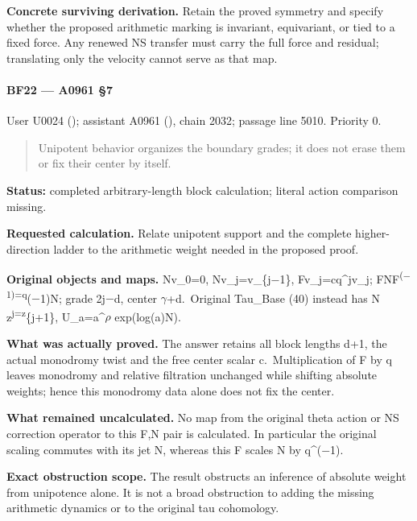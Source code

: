 \textbf{Concrete surviving derivation.} Retain the proved symmetry and
specify whether the proposed arithmetic marking is invariant,
equivariant, or tied to a fixed force. Any renewed NS transfer must
carry the full force and residual; translating only the velocity cannot
serve as that map.

\paragraph{BF22 --- A0961 §7}\label{bf22-a0961-7}

User U0024 (\protect{});
assistant A0961 (\protect{}),
chain 2032; passage line 5010. Priority 0.

\begin{quote}
Unipotent behavior organizes the boundary grades; it does not erase them
or fix their center by itself.
\end{quote}

\textbf{Status:} completed arbitrary-length block calculation; literal
action comparison missing.

\textbf{Requested calculation.} Relate unipotent support and the
complete higher-direction ladder to the arithmetic weight needed in the
proposed proof.

\textbf{Original objects and maps.} Nv\_0=0,
Nv\_j=v\_\{j\allowbreak{}\ensuremath{−}\allowbreak{}1\},
Fv\_j=cq\^{}jv\_j;
FNF\textsuperscript{(\allowbreak{}\ensuremath{−}\allowbreak{}1)=q}(\allowbreak{}\ensuremath{−}\allowbreak{}1)N;
grade 2j\allowbreak{}\ensuremath{−}\allowbreak{}d, center
\allowbreak{}\ensuremath{γ}\allowbreak{}+d. Original Tau\_Base (40)
instead has N z\textsuperscript{j=z}\{j+1\},
U\_a=a\textasciicircum{}\allowbreak{}\ensuremath{ρ}\allowbreak{}
exp(log(a)N).

\textbf{What was actually proved.} The answer retains all block lengths
d+1, the actual monodromy twist and the free center scalar
c.~Multiplication of F by q leaves monodromy and relative filtration
unchanged while shifting absolute weights; hence this monodromy data
alone does not fix the center.

\textbf{What remained uncalculated.} No map from the original theta
action or NS correction operator to this F,N pair is calculated. In
particular the original scaling commutes with its jet N, whereas this F
scales N by
q\textasciicircum{}(\allowbreak{}\ensuremath{−}\allowbreak{}1).

\textbf{Exact obstruction scope.} The result obstructs an inference of
absolute weight from unipotence alone. It is not a broad obstruction to
adding the missing arithmetic dynamics or to the original tau
cohomology.

